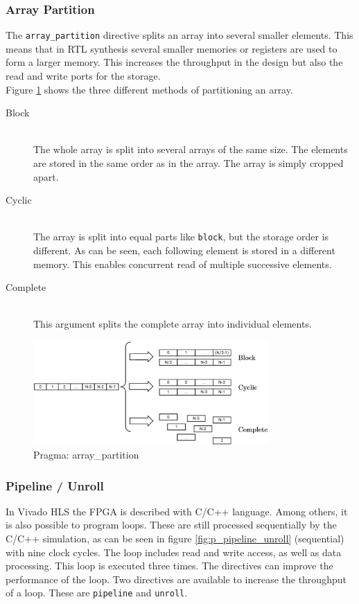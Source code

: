 \subsubsection*{Array Partition}
The \texttt{array\_partition} directive splits an array into several smaller
elements. This means that in RTL synthesis several smaller memories or registers
are used to form a larger memory. This increases the throughput in the
design but also the read and write ports for the storage. \\
Figure \ref{fig:p_array_partition} shows the three different methods of partitioning an array.

\begin{description}
\item[Block]\hfill \\
The whole array is split into several arrays of the same size. The elements are stored in the same order as in the array. The array is simply cropped apart.
\item[Cyclic]\hfill \\ 
The array is split into equal parts like \texttt{block}, but the storage order
is different. As can be seen, each following element is stored in a different
memory. This enables concurrent read of multiple successive elements.
\item[Complete]\hfill \\ 
This argument splits the complete array into individual elements.
\end{description}


\begin{figure}[tb!]
    \centering
    \includegraphics[width=0.8\textwidth]{images/theory/array_partition.png}
    \caption{Pragma: array\_partition}
    \label{fig:p_array_partition}
\end{figure}

\subsubsection*{Pipeline / Unroll}
In Vivado HLS the FPGA is described with C/C++ language. Among others, it is also possible to program  loops. These are still processed sequentially by the C/C++ simulation, as can be seen in figure \ref{fig:p_pipeline_unroll} (sequential) with nine clock cycles. The loop includes read and write access, as well as data processing. This loop is executed three times.  The directives can improve the performance of the loop. Two directives are available to increase the throughput of a loop. These are \texttt{pipeline} and \texttt{unroll}.

